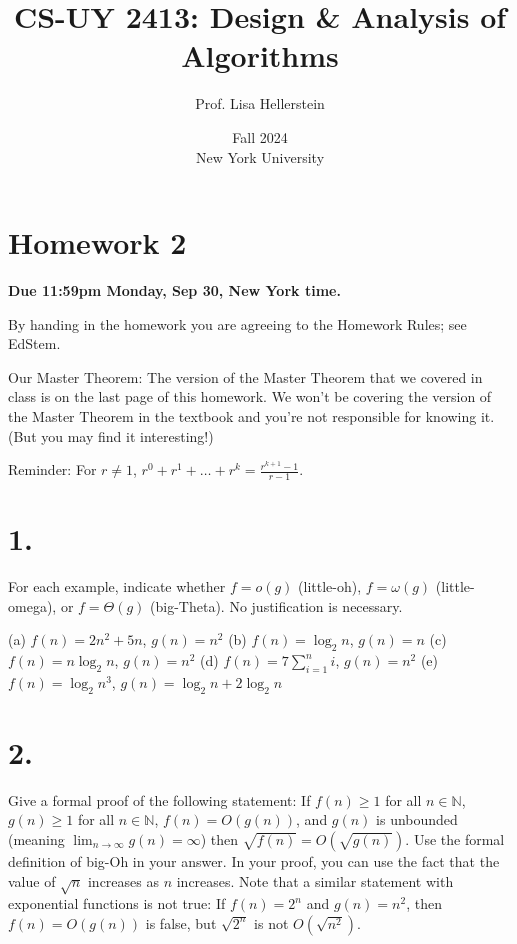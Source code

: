 \documentclass{article}
\begin{document}
\title{CS-UY 2413: Design \& Analysis of Algorithms}
\author{Prof. Lisa Hellerstein}
\date{Fall 2024 \\ New York University}

\maketitle

\section*{Homework 2}
\textbf{Due 11:59pm Monday, Sep 30, New York time.}

By handing in the homework you are agreeing to the Homework Rules; see EdStem.

Our Master Theorem: The version of the Master Theorem that we covered in class is on the last page of this homework. We won’t be covering the version of the Master Theorem in the textbook and you’re not responsible for knowing it. (But you may find it interesting!)

Reminder: For $r \neq 1$, $r^0 + r^1 + \dots + r^k = \frac{r^{k+1}-1}{r-1}$.

\section*{1.}
For each example, indicate whether $f = o(g)$ (little-oh), $f = \omega(g)$ (little-omega), or $f = \Theta(g)$ (big-Theta). No justification is necessary.

(a) $f(n) = 2n^2 + 5n$, $g(n) = n^2$
(b) $f(n) = \log_2 n$, $g(n) = n$
(c) $f(n) = n \log_2 n$, $g(n) = n^2$
(d) $f(n) = 7 \sum_{i=1}^n i$, $g(n) = n^2$
(e) $f(n) = \log_2 n^3$, $g(n) = \log_2 n + 2 \log_2 n$

\section*{2.}
Give a formal proof of the following statement: If $f(n) \ge 1$ for all $n \in \mathbb{N}$, $g(n) \ge 1$ for all $n \in \mathbb{N}$, $f(n) = O(g(n))$, and $g(n)$ is unbounded (meaning $\lim_{n \to \infty} g(n) = \infty$) then $\sqrt{f(n)} = O(\sqrt{g(n)})$.
Use the formal definition of big-Oh in your answer. In your proof, you can use the fact that the value of $\sqrt{n}$ increases as $n$ increases.
Note that a similar statement with exponential functions is not true: If $f(n) = 2^n$ and $g(n) = n^2$, then $f(n) = O(g(n))$ is false, but $\sqrt{2^n}$ is not $O(\sqrt{n^2})$.
\end{document}
